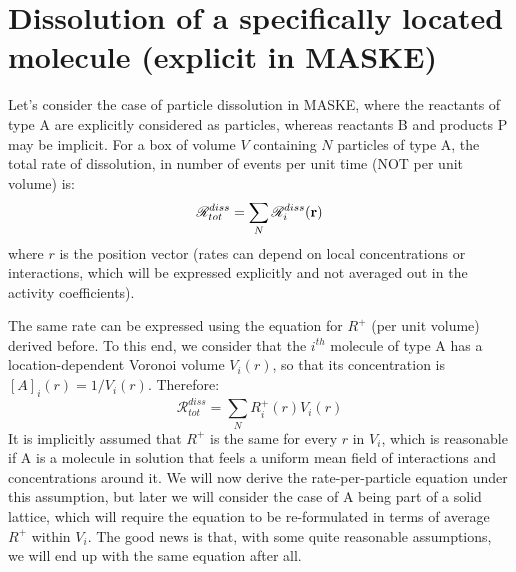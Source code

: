 \documentclass[12pt]{paper}    %
\newcommand{\RR}{\mathscr{R}}
\begin{document}
\section{Dissolution of a specifically located molecule (explicit in MASKE)}

Let's consider the case of particle dissolution in MASKE, where the reactants of type A are explicitly considered as particles, whereas reactants B and products P may be implicit. For a box of volume $V$ containing $N$ particles of type A, the total rate of dissolution, in number of events per unit time (NOT per unit volume) is:
%
\begin{equation}
\RR^{diss}_{tot} =  \sum_N \RR^{diss}_i ({\bf r})  \label{eqRD1}
\end{equation}
%
where $r$ is the position vector (rates can depend on local concentrations or interactions, which will be expressed explicitly and not averaged out in the activity coefficients).

The same rate can be expressed using the equation for $R^+$ (per unit volume) derived before. To this end, we consider that the $i^{th}$ molecule of type A has a location-dependent Voronoi volume $V_i(r)$, so that its concentration is $[A]_i(r) = 1/V_i(r)$. Therefore:
%
\begin{equation}
\RR^{diss}_{tot} =  \sum_N R^+_i(r) V_i(r)  \label{eqRD2}
\end{equation}
%
It is implicitly assumed that $R^+$ is the same for every $r$ in $V_i$, which is reasonable if A is a molecule in solution that feels a uniform mean field of interactions and concentrations around it. We will now derive the rate-per-particle equation under this assumption, but later we will consider the case of A being part of a solid lattice, which will require the equation to be re-formulated in terms of average $R^+$ within $V_i$. The good news is that, with some quite reasonable assumptions, we will end up with the same equation after all.
\end{document}
